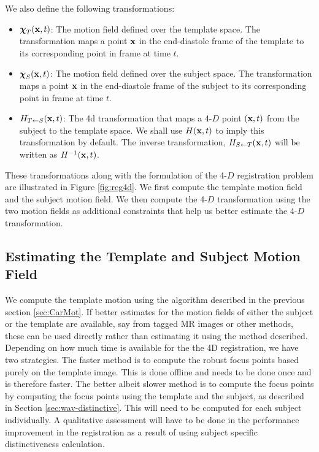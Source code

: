 We also define the following transformations:
\begin{itemize}
  \item ${\boldsymbol{\chi}}_T ( \mathbf{x}, t )$: The motion field defined over the template
  space. The transformation maps a point $\mathbf{x}$ in the end-diastole frame
  of the template to its corresponding point in frame at time $t$.
  
  \item ${\boldsymbol{\chi}}_S ( \mathbf{x}, t )$: The motion field defined over the subject space.
  The transformation maps a point $\mathbf{x}$ in the end-diastole frame of the
  subject to its corresponding point in frame at time $t$.
  
  \item $H_{T \leftarrow S} ( \mathbf{x}, t )$: The 4d transformation that maps a
  4-$D$ point $( \mathbf{x}, t )$ from the subject to the template space. We shall use $H ( \mathbf{x}, t )$ to imply this transformation by default. The inverse transformation, $H_{S \leftarrow T} ( \mathbf{x}, t )$ will be written as $H^{-1} ( \mathbf{x}, t )$.
\end{itemize}
These transformations along with the formulation of the 4-$D$ registration problem are illustrated in Figure \ref {fig:reg4d}. We first compute the template motion field and the subject motion field. We then compute the 4-$D$ transformation using the two motion fields as additional constraints that help us better estimate the 4-$D$ transformation.

\subsection{Estimating the Template and Subject Motion Field}

We compute the template motion using the algorithm described in the previous section \ref{sec:CarMot}. If better estimates for the motion fields of either the subject or the template are available, say from tagged MR images or other methods, these can be used directly rather than estimating it using the method described. Depending on how much time is available for the the 4D registration, we have two strategies. The faster method is to compute the robust focus points based purely on the template image. This is done offline and needs to be done once and is therefore faster. The better albeit slower method is to compute the focus points by computing the focus points using the template and the subject, as described in Section \ref{sec:wav-distinctive}. This will need to be computed for each subject individually. A qualitative assessment will have to be done in the performance improvement in the registration as a result of using subject specific distinctiveness calculation.

